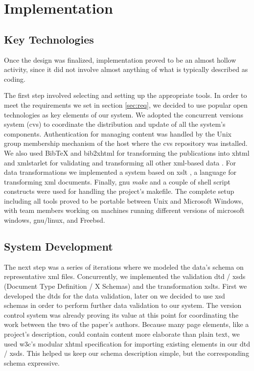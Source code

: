 \documentclass[10pt]{article}
\begin{document}
\section{Implementation}

\subsection{Key Technologies}

Once the design was finalized,
implementation proved to be an almost hollow activity,
since it did not involve almost anything of what
is typically described as coding.

The first step involved selecting and setting up the
appropriate tools. In order to meet the requirements we set in section \ref{sec:req}, 
we decided to use popular open
technologies as key elements of our system.
We adopted the concurrent versions system
({\sc cvs}) \cite{BF01, CVS} to coordinate the distribution
and update of all the system's components.
Authentication for managing content was handled by the
Unix group membership mechanism of the host where the
{\sc cvs} repository was installed.
We also used
{\sc BibTeX} \cite{Pa88, Lam94} and {\sc bib2xhtml} \cite{BibXHMTL} for transforming the publications
into {\sc xhtml} and
xmlstarlet \cite{Gru04} for validating and transforming
all other {\sc xml}-based data \cite{W3C_XML}.
For data transformations we 
implemented a system based on {\sc xslt} \cite{W3C_XSLT}, a language for transforming {\sc xml} documents.
Finally, {\sc gnu} {\em make} \cite{gnu_make} and a couple of shell script
constructs were used for handling the project's makefile.
The complete setup including all tools proved to be portable
between Unix and Microsoft Windows, with team members working
on machines running different versions of {\sc microsoft windows}, {\sc gnu/linux},
and Free{\sc bsd}.

\subsection{System Development}

The next step was a series of iterations where we
modeled the data's schema on representative {\sc xml}
files. Concurrently, we implemented the validation {\sc dtd / xsd}s (Document Type Definition / X Schemas)
and the transformation {\sc xslt}s. First we developed the {\sc dtd}s
for the data validation, later on we decided to use {\sc xsd} schemas in order to perform
further data validation to our system.
The version control system was already proving its value
at this point
for coordinating the work between the two of the paper's authors.
Because many page elements, like a project's description,
could contain content more elaborate than plain text,
we used {\sc w3c}'s modular {\sc xhtml} specification for
importing existing elements in our {\sc dtd / xsd}s.
This helped us keep our schema description simple,
but the corresponding schema expressive.
\end{document}
